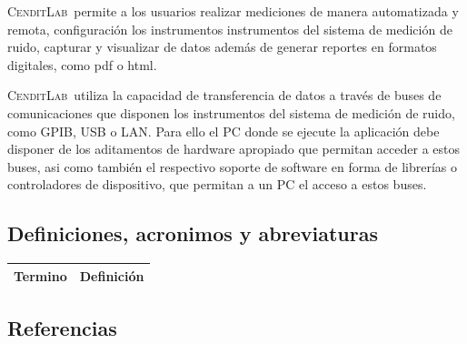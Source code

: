 \documentclass[paper=a4,oneside,fontsize=12pt]{scrartcl}
\newcommand{\AppName}{\textsc{CenditLab}\ }
\newcommand{\smr}{sistema de medición de ruido}
\begin{document}
	\AppName permite a los usuarios realizar mediciones de manera automatizada y remota, configuración los instrumentos instrumentos del \smr, capturar y visualizar de datos además de generar reportes en formatos digitales, como pdf o html.
	
	\AppName utiliza la capacidad de transferencia de datos a través de buses de comunicaciones que disponen los instrumentos del \smr, como GPIB, USB o LAN. Para ello el PC donde se ejecute la aplicación debe disponer de los aditamentos de hardware apropiado que permitan acceder a estos buses, asi como también el respectivo soporte de software en forma de librerías o controladores de dispositivo, que permitan a un PC el acceso a estos buses.
	
	\subsection{Definiciones, acronimos y abreviaturas}
	
	\begin{table}[h!]
		\begin{tabular}{|p{4cm}|p{10cm}|} 
			\hline
			Termino & Definición \\
			\hline
		\end{tabular}	
	\end{table}

	\subsection{Referencias}
	
	
\end{document}

